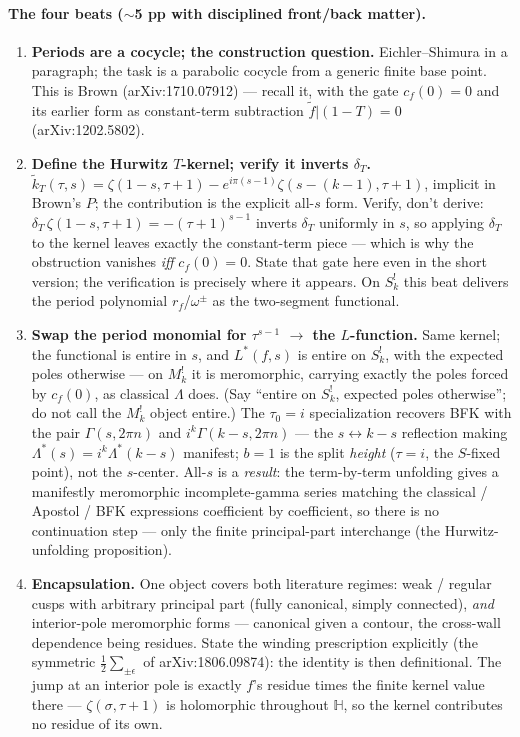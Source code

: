 \documentclass[11pt]{article}
\newcommand{\HH}{\mathbb{H}}
\newcommand{\tk}{\widetilde{k}_T}
\begin{document}
\paragraph{The four beats ($\sim$5 pp with disciplined front/back matter).}
\begin{enumerate}[leftmargin=1.6em,topsep=2pt,itemsep=4pt]
\item \textbf{Periods are a cocycle; the construction question.} Eichler--Shimura in
a paragraph; the task is a parabolic cocycle from a generic finite base point. This
is Brown (arXiv:1710.07912) --- recall it, with the gate $c_f(0)=0$ and its earlier
form as constant-term subtraction $\widetilde f|(1-T)=0$ (arXiv:1202.5802).
\item \textbf{Define the Hurwitz $T$-kernel; verify it inverts $\delta_T$.}
$\tk(\tau,s)=\zeta(1-s,\tau+1)-e^{i\pi(s-1)}\zeta(s-(k-1),\tau+1)$, implicit in
Brown's $P$; the contribution is the explicit all-$s$ form. Verify, don't derive:
$\delta_T\,\zeta(1-s,\tau+1)=-(\tau+1)^{s-1}$ inverts $\delta_T$ uniformly in $s$, so
applying $\delta_T$ to the kernel leaves exactly the constant-term piece --- which is
why the obstruction vanishes \emph{iff} $c_f(0)=0$. State that gate here even in the
short version; the verification is precisely where it appears. On $S_k^!$ this beat
delivers the period polynomial $r_f$/$\omega^\pm$ as the two-segment functional.
\item \textbf{Swap the period monomial for $\tau^{s-1}$ $\to$ the $L$-function.}
Same kernel; the functional is entire in $s$, and $L^*(f,s)$ is entire on $S_k^!$,
with the expected poles otherwise --- on $M_k^!$ it is meromorphic, carrying exactly
the poles forced by $c_f(0)$, as classical $\Lambda$ does. (Say ``entire on $S_k^!$,
expected poles otherwise''; do not call the $M_k^!$ object entire.) The $\tau_0=i$
specialization recovers BFK with the pair $\Gamma(s,2\pi n)$ and
$i^k\Gamma(k-s,2\pi n)$ --- the $s\leftrightarrow k-s$ reflection making
$\Lambda^*(s)=i^k\Lambda^*(k-s)$ manifest; $b=1$ is the split \emph{height}
($\tau=i$, the $S$-fixed point), not the $s$-center. All-$s$ is a \emph{result}: the
term-by-term unfolding gives a manifestly meromorphic incomplete-gamma series
matching the classical / Apostol / BFK expressions coefficient by coefficient, so
there is no continuation step --- only the finite principal-part interchange (the
Hurwitz-unfolding proposition).
\item \textbf{Encapsulation.} One object covers both literature regimes: weak /
regular cusps with arbitrary principal part (fully canonical, simply connected),
\emph{and} interior-pole meromorphic forms --- canonical given a contour, the
cross-wall dependence being residues. State the winding prescription explicitly (the
symmetric $\tfrac12\sum_{\pm\epsilon}$ of arXiv:1806.09874): the identity is then
definitional. The jump at an interior pole is exactly $f$'s residue times the finite
kernel value there --- $\zeta(\sigma,\tau+1)$ is holomorphic throughout $\HH$, so the
kernel contributes no residue of its own.
\end{enumerate}
\end{document}
